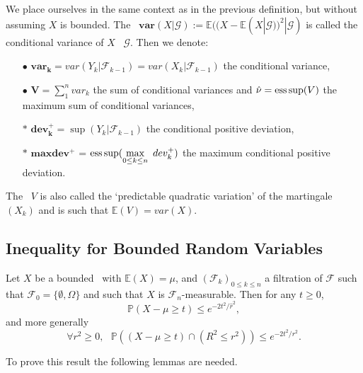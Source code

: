 \begin{notation}
We place ourselves in the same context as in the previous definition, but without assuming $X$ is bounded. The \rv~$\mathbf{var}(X|\mathcal{G}) := \mathbb{E}((X-\mathbb{E}(X|\mathcal{G}))^2|\mathcal{G}) $ is called the conditional variance of $X$ \wrt~$\mathcal{G}$. Then we denote:
\begin{itemize}
\item [$\bullet$] $\mathbf{var_k} = var(Y_k|\mathcal{F}_{k-1})=var(X_k|\mathcal{F}_{k-1})$ the conditional variance, 
\item [$\bullet$] $\mathbf{V} = \sum_{1}^{n} var_k$ the sum of conditional variances and $\hat\nu= \supess(V)$ the maximum sum of conditional variances,
\item [$\ast$] $\mathbf{dev_k^+} = \sup(Y_k|\mathcal{F}_{k-1})$ the conditional positive deviation,
\item  [$\ast$] $\mathbf{maxdev^+} $ = $ \supess(\displaystyle\max_{0 \leq k \leq n}~ dev_k^+)$  the maximum conditional positive deviation.
\end{itemize}
\end{notation}

The \rv~$V$ is also called the `predictable quadratic variation' of the martingale $(X_k)$ and is such that $\mathbb{E}(V)= var(X)$.


\subsection{Inequality for Bounded Random Variables}

\begin{theorem} \citep{McDiarmid98}
\label{3.14}
Let $X$ be a bounded \rv~with $\mathbb{E}(X)=\mu$, and $(\mathcal{F}_k)_{0\leq k \leq n}$ a filtration of $\mathcal{F}$ such that $ \mathcal{F}_0 =  \{\emptyset , \Omega\} $ and such that $X$ is $\mathcal{F}_n$-measurable. 
Then for any $t \geq 0$, $$\mathbb{P}(X-\mu \geq t) \leq e^{-2t^2/\hat r^2},$$ and more generally $$\forall r^2 \geq 0,~~~ \mathbb{P}((X-\mu \geq t)\cap(R^2 \leq r^2)) \leq e^{-2t^2/ r^2}.$$
\end{theorem}

To prove this result the following lemmas are needed.


